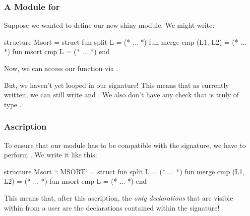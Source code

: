 \documentclass[aspectratio=169]{beamer}
\begin{document}
\begin{frame}[fragile]
  \frametitle{A Module for }

  Suppose we wanted to define our new shiny  module. We might write:

  \pause
  \begin{codeblock}
    structure Msort =
      struct
        fun split L = (* ... *)
        fun merge cmp (L1, L2) = (* ... *)
        fun msort cmp L = (* ... *)
      end
  \end{codeblock}

  \pause
  \vspace{\fill}

  Now, we can access our  function via .

  \pause
  \vspace{\fill}

  But, we haven't yet looped in our  signature! This means that
  as currently written, we can still write  and .
  We also don't have any check that  is truly of type
  .
\end{frame}

\begin{frame}[fragile]
  \frametitle{Ascription}


  \pause
  \vspace{\fill}

  To ensure that our  module has to be compatible with the
   signature, we have to perform . We write it
  like this:

  \begin{codeblock}
    structure Msort `: MSORT` =
      struct
        fun split L = (* ... *)
        fun merge cmp (L1, L2) = (* ... *)
        fun msort cmp L = (* ... *)
      end
  \end{codeblock}

  \pause
  \vspace{\fill}

  This means that, after this ascription, the \textit{only declarations} that
  are visible within  from a user are the declarations contained
  within the  signature!
\end{frame}
\end{document}
